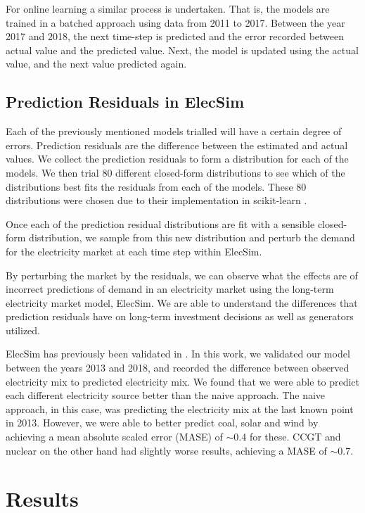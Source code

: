 \documentclass[final,3p,times,twocolumn,numbers]{elsarticle}
\begin{document}
For online learning a similar process is undertaken. That is, the models are trained in a batched approach using data from 2011 to 2017. Between the year 2017 and 2018, the next time-step is predicted and the error recorded between actual value and the predicted value. Next, the model is updated using the actual value, and the next value predicted again.


\subsection{Prediction Residuals in ElecSim}

Each of the previously mentioned models trialled will have a certain degree of errors. Prediction residuals are the difference between the estimated and actual values. We collect the prediction residuals to form a distribution for each of the models. We then trial 80 different closed-form distributions to see which of the distributions best fits the residuals from each of the models. These 80 distributions were chosen due to their implementation in scikit-learn \cite{scikit-learn}.

Once each of the prediction residual distributions are fit with a sensible closed-form distribution, we sample from this new distribution and perturb the demand for the electricity market at each time step within ElecSim.

By perturbing the market by the residuals, we can observe what the effects are of incorrect predictions of demand in an electricity market using the long-term electricity market model, ElecSim. We are able to understand the differences that prediction residuals have on long-term investment decisions as well as generators utilized.

ElecSim has previously been validated in \cite{Kell2020}. In this work, we validated our model between the years 2013 and 2018, and recorded the difference between observed electricity mix to predicted electricity mix. We found that we were able to predict each different electricity source better than the naive approach. The naive approach, in this case, was predicting the electricity mix at the last known point in 2013. However, we were able to better predict coal, solar and wind by achieving a mean absolute scaled error (MASE) of ${\sim}$0.4 for these. CCGT and nuclear on the other hand had slightly worse results, achieving a MASE of ${\sim}$0.7.



\section{Results}
\label{sec:results}
\end{document}
